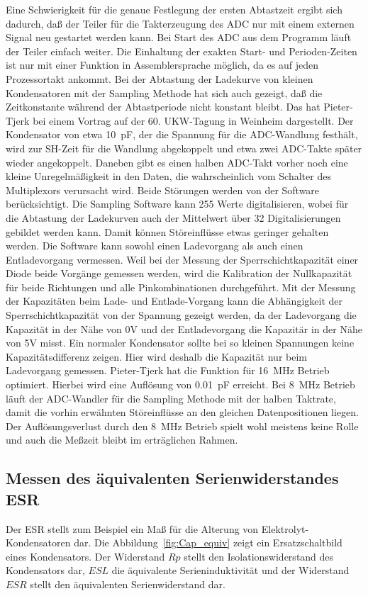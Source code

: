 Eine Schwierigkeit für die genaue Festlegung der ersten Abtastzeit ergibt sich dadurch, daß der
Teiler für die Takterzeugung des ADC nur mit einem externen Signal neu gestartet werden kann.
Bei Start des ADC aus dem Programm läuft der Teiler einfach weiter.
Die Einhaltung der exakten Start- und Perioden-Zeiten ist nur mit einer Funktion in Assemblersprache möglich,
da es auf jeden Prozessortakt ankommt.
Bei der Abtastung der Ladekurve von kleinen Kondensatoren mit der Sampling Methode hat sich auch gezeigt,
daß die Zeitkonstante während der Abtastperiode nicht konstant bleibt. Das hat Pieter-Tjerk bei einem
Vortrag auf der 60. UKW-Tagung in Weinheim dargestellt. Der Kondensator von etwa 10~pF,
der die Spannung für die ADC-Wandlung festhält,
wird zur SH-Zeit für die Wandlung abgekoppelt und etwa zwei ADC-Takte später wieder angekoppelt.
Daneben gibt es einen halben ADC-Takt vorher noch eine kleine Unregelmäßigkeit in den Daten, die wahrscheinlich
vom Schalter des Multiplexors verursacht wird. Beide Störungen werden von der Software berücksichtigt.
Die Sampling Software kann 255 Werte digitalisieren, wobei für die Abtastung der Ladekurven auch der Mittelwert
über 32 Digitalisierungen gebildet werden kann.
Damit können Störeinflüsse etwas geringer gehalten werden.
Die Software kann sowohl einen Ladevorgang als auch einen Entladevorgang vermessen. Weil bei der
Messung der Sperrschichtkapazität einer Diode beide Vorgänge gemessen werden, wird die Kalibration der
Nullkapazität für beide Richtungen und alle Pinkombinationen durchgeführt. 
Mit der Messung der Kapazitäten beim Lade- und Entlade-Vorgang kann die Abhängigkeit der Sperrschichtkapazität
von der Spannung gezeigt werden, da der Ladevorgang die Kapazität in der Nähe von 0V und der Entladevorgang
die Kapazitär in der Nähe von 5V misst. Ein normaler Kondensator sollte bei so kleinen Spannungen keine
Kapazitätsdifferenz zeigen. Hier wird deshalb die Kapazität nur beim Ladevorgang gemessen.
Pieter-Tjerk hat die Funktion für 16~MHz Betrieb optimiert. Hierbei wird eine Auflösung von 0.01~pF erreicht.
Bei 8~MHz Betrieb läuft der ADC-Wandler für die Sampling Methode mit der halben Taktrate, damit die 
vorhin erwähnten Störeinflüsse an den gleichen Datenpositionen liegen.
Der Auflösungsverlust durch den 8~MHz Betrieb spielt wohl meistens keine Rolle und auch die Meßzeit
bleibt im erträglichen Rahmen.

\subsection{Messen des äquivalenten Serienwiderstandes ESR}
Der ESR \cite{ESR} stellt zum Beispiel ein Maß für die Alterung von Elektrolyt-Kondensatoren dar.
Die Abbildung~\ref{fig:Cap_equiv} zeigt ein Ersatzschaltbild eines Kondensators.
Der Widerstand \(Rp\) stellt den Isolationswiderstand des Kondensators dar, \(ESL\) die äquivalente
Serieninduktivität und der Widerstand \(ESR\) stellt den äquivalenten Serienwiderstand dar.

